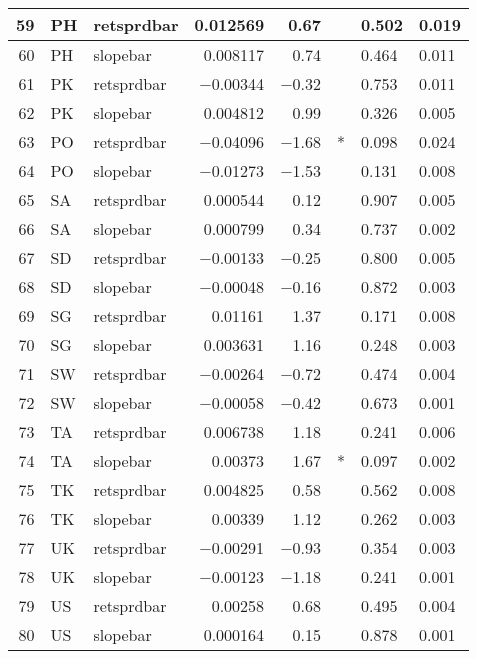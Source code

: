 \begin{longtable}{|r|l|l|r|r|l|l|l|}
   59 &    PH &    retsprdbar &    0.012569 &    0.67 &      &    0.502 &    0.019\\\hline
   60 &    PH &    slopebar &    0.008117 &    0.74 &      &    0.464 &    0.011\\\hline
   61 &    PK &    retsprdbar &    $-$0.00344 &    $-$0.32 &      &    0.753 &    0.011\\\hline
   62 &    PK &    slopebar &    0.004812 &    0.99 &      &    0.326 &    0.005\\\hline
   63 &    PO &    retsprdbar &    $-$0.04096 &    $-$1.68 &    * &    0.098 &    0.024\\\hline
   64 &    PO &    slopebar &    $-$0.01273 &    $-$1.53 &      &    0.131 &    0.008\\\hline
   65 &    SA &    retsprdbar &    0.000544 &    0.12 &      &    0.907 &    0.005\\\hline
   66 &    SA &    slopebar &    0.000799 &    0.34 &      &    0.737 &    0.002\\\hline
   67 &    SD &    retsprdbar &    $-$0.00133 &    $-$0.25 &      &    0.800 &    0.005\\\hline
   68 &    SD &    slopebar &    $-$0.00048 &    $-$0.16 &      &    0.872 &    0.003\\\hline
   69 &    SG &    retsprdbar &    0.01161 &    1.37 &      &    0.171 &    0.008\\\hline
   70 &    SG &    slopebar &    0.003631 &    1.16 &      &    0.248 &    0.003\\\hline
   71 &    SW &    retsprdbar &    $-$0.00264 &    $-$0.72 &      &    0.474 &    0.004\\\hline
   72 &    SW &    slopebar &    $-$0.00058 &    $-$0.42 &      &    0.673 &    0.001\\\hline
   73 &    TA &    retsprdbar &    0.006738 &    1.18 &      &    0.241 &    0.006\\\hline
   74 &    TA &    slopebar &    0.00373 &    1.67 &    * &    0.097 &    0.002\\\hline
   75 &    TK &    retsprdbar &    0.004825 &    0.58 &      &    0.562 &    0.008\\\hline
   76 &    TK &    slopebar &    0.00339 &    1.12 &      &    0.262 &    0.003\\\hline
   77 &    UK &    retsprdbar &    $-$0.00291 &    $-$0.93 &      &    0.354 &    0.003\\\hline
   78 &    UK &    slopebar &    $-$0.00123 &    $-$1.18 &      &    0.241 &    0.001\\\hline
   79 &    US &    retsprdbar &    0.00258 &    0.68 &      &    0.495 &    0.004\\\hline
   80 &    US &    slopebar &    0.000164 &    0.15 &      &    0.878 &    0.001\\\hline
\end{longtable}


